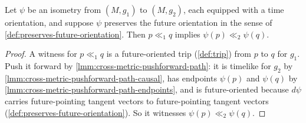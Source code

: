 \begin{lemma}
    \label{lmm:cross-metric-isometry-preserves-chronology}
    \leanok
    Let $\psi$ be an isometry from $(M,g_1)$ to $(M,g_2)$, each equipped with a time orientation, and suppose $\psi$ preserves the future orientation in the sense of \ref{def:preserves-future-orientation}. Then $p \ll_1 q$ implies $\psi(p) \ll_2 \psi(q)$.
\end{lemma}
\begin{proof}
    \leanok
    A witness for $p \ll_1 q$ is a future-oriented trip (\ref{def:trip}) from $p$ to $q$ for $g_1$. Push it forward by \ref{lmm:cross-metric-pushforward-path}: it is timelike for $g_2$ by \ref{lmm:cross-metric-pushforward-path-causal}, has endpoints $\psi(p)$ and $\psi(q)$ by \ref{lmm:cross-metric-pushforward-path-endpoints}, and is future-oriented because $d\psi$ carries future-pointing tangent vectors to future-pointing tangent vectors (\ref{def:preserves-future-orientation}). So it witnesses $\psi(p) \ll_2 \psi(q)$.
\end{proof}

\medskip


